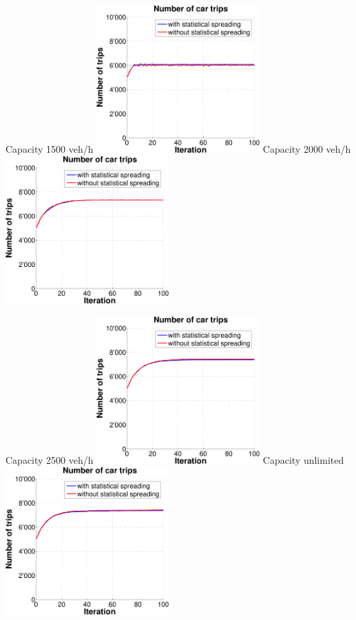 {  \createsubfigure%
  {Capacity 1500 veh/h}%
  {\includegraphics[width=0.47\textwidth, angle=0, trim=0mm 0mm 0mm 9mm, clip=true]{extending/figures/MultiModalSimulation/simulations/num_car_trips_no_scatter_1500}}%
  {\label{}}%
  {\hspace{3mm}}%
  \createsubfigure%
  {Capacity 2000 veh/h}%
  {\includegraphics[width=0.47\textwidth, angle=0, trim=0mm 0mm 0mm 9mm, clip=true]{extending/figures/MultiModalSimulation/simulations/num_car_trips_no_scatter_2000}}%
  {\label{}}%
  {\vspace{7.5mm}}%

  \createsubfigure%
  {Capacity 2500 veh/h}%
  {\includegraphics[width=0.47\textwidth, angle=0, trim=0mm 0mm 0mm 9mm, clip=true]{extending/figures/MultiModalSimulation/simulations/num_car_trips_no_scatter_2500}}%
  {\label{}}%
  {\hspace{3mm}}%
  \createsubfigure%
  {Capacity unlimited}%
  {\includegraphics[width=0.47\textwidth, angle=0, trim=0mm 0mm 0mm 9mm, clip=true]{extending/figures/MultiModalSimulation/simulations/num_car_trips_no_scatter_unlimited}}%
  {\label{}}%
  {}%
}%
